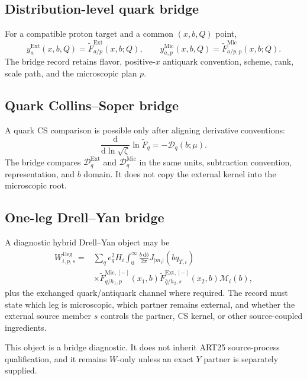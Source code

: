 \documentclass[11pt]{article}
\newcommand{\dd}{\mathrm{d}}
\newcommand{\cM}{\mathcal M}
\newcommand{\cD}{\mathcal D}
\newcommand{\Ext}{\ensuremath{\mathrm{Ext}}}
\newcommand{\Mic}{\ensuremath{\mathrm{Mic}}}
\begin{document}
\subsection{Distribution-level quark bridge}

For a compatible proton target and a common \((x,b,Q)\) point,
\begin{equation}
 y_{a}^{\Ext}(x,b,Q)
 =
 \widetilde F_{a/p}^{\Ext}(x,b;Q),
 \qquad
 y_{a,p}^{\Mic}(x,b,Q)
 =
 \widetilde F_{a/p,p}^{\Mic}(x,b;Q).
 \label{eq:distribution-bridge}
\end{equation}
The bridge record retains flavor, positive-\(x\) antiquark convention, scheme, rank, scale path, and the microscopic plan \(p\).

\subsection{Quark Collins--Soper bridge}

A quark CS comparison is possible only after aligning derivative conventions:
\begin{equation}
 \frac{\dd}{\dd\ln\sqrt\zeta}
 \ln\widetilde F_q
 =-\cD_q(b;\mu).
 \label{eq:cs-convention}
\end{equation}
The bridge compares \(\cD_q^{\Ext}\) and \(\cD_q^{\Mic}\) in the same units, subtraction convention, representation, and \(b\) domain.  It does not copy the external kernel into the microscopic root.

\subsection{One-leg Drell--Yan bridge}

A diagnostic hybrid Drell--Yan object may be
\begin{align}
 W_{i,p,s}^{\mathrm{1leg}}
 ={}&
 \sum_q e_q^2 H_i
 \int_0^\infty\frac{b\,\dd b}{2\pi}
 J_{|m_i|}(bq_{T,i})
 \nonumber\\
 &\times
 \widetilde F_{q/h_1,p}^{\Mic,[-]}(x_1,b)
 \widetilde F_{\bar q/h_2,s}^{\Ext,[-]}(x_2,b)
 \cM_i(b),
 \label{eq:dy-one-leg}
\end{align}
plus the exchanged quark/antiquark channel where required.  The record must state which leg is microscopic, which partner remains external, and whether the external source member \(s\) controls the partner, CS kernel, or other source-coupled ingredients.

This object is a bridge diagnostic.  It does not inherit ART25 source-process qualification, and it remains \(W\)-only unless an exact \(Y\) partner is separately supplied.
\end{document}
